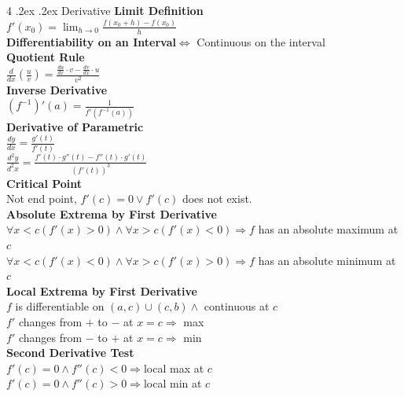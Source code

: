 \documentclass[10pt,landscape,a4paper]{article}
\makeatletter
\renewcommand{\section}{\@startsection{section}{1}{0mm}%
                                {.2ex}%
                                {.2ex}%
                                {\color{myblue}\sffamily\small\bfseries}}
\makeatother
\begin{document}
\begin{multicols*}{4}
\section{Derivative}
\textbf{Limit Definition}\\$f'(x_0)=\lim_{h\to 0}\frac{f(x_0+h)-f(x_0)}{h}$\\
\textbf{Differentiability on an Interval}$\Leftrightarrow$ Continuous on the interval\\
\textbf{Quotient Rule}\\$\frac{d}{dx}(\frac{u}{v})=\frac{\frac{du}{dx}\cdot v-\frac{dv}{dx}\cdot u}{v^2}$\\
\textbf{Inverse Derivative}\\$(f^{-1})'(a)=\frac{1}{f'(f^{-1}(a))}$\\
\textbf{Derivative of Parametric}\\$\frac{dy}{dx}=\frac{g'(t)}{f'(t)}$\\
$\frac{d^2y}{d^2x}=\frac{f'(t)\cdot g''(t)-f''(t)\cdot g'(t)}{(f'(t))^3}$\\
\textbf{Critical Point}\\Not end point, $f'(c)=0\vee f'(c)$ does not exist.\\
\textbf{Absolute Extrema by First Derivative}\\
$\forall x<c(f'(x)>0)\wedge\forall x>c(f'(x)<0)\Rightarrow f$ has an absolute maximum at $c$\\
$\forall x<c(f'(x)<0)\wedge\forall x>c(f'(x)>0)\Rightarrow f$ has an absolute minimum at $c$\\
\textbf{Local Extrema by First Derivative}\\
$f$ is differentiable on $(a,c)\cup(c,b)\wedge$ continuous at $c$\\
$f'$ changes from $+$ to $-$ at $x=c\Rightarrow$ max\\
$f'$ changes from $-$ to $+$ at $x=c\Rightarrow$ min\\
\textbf{Second Derivative Test}\\
$f'(c)=0\wedge f''(c)<0\Rightarrow$local max at $c$\\
$f'(c)=0\wedge f''(c)>0\Rightarrow$local min at $c$\\

\end{multicols*}
\end{document}
